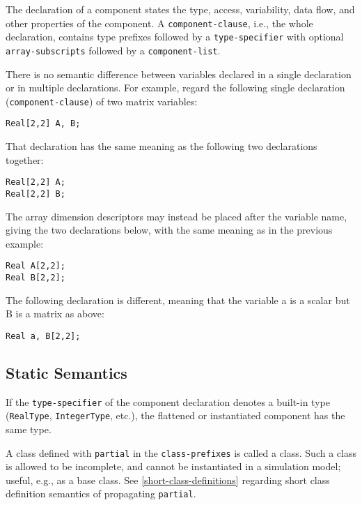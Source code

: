 \begin{nonnormative}
The declaration of a component states the type, access, variability, data flow, and other properties of the component.
A \lstinline[language=grammar]!component-clause!, i.e., the whole declaration, contains type prefixes followed by a \lstinline[language=grammar]!type-specifier! with optional \lstinline[language=grammar]!array-subscripts! followed by a \lstinline[language=grammar]!component-list!.

There is no semantic difference between variables declared in a single declaration or in multiple declarations.
For example, regard the following single declaration (\lstinline[language=grammar]!component-clause!) of two matrix variables:
\begin{lstlisting}[language=modelica]
Real[2,2] A, B;
\end{lstlisting}
That declaration has the same meaning as the following two
declarations together:
\begin{lstlisting}[language=modelica]
Real[2,2] A;
Real[2,2] B;
\end{lstlisting}
The array dimension descriptors may instead be placed after the
variable name, giving the two declarations below, with the same meaning
as in the previous example:
\begin{lstlisting}[language=modelica]
Real A[2,2];
Real B[2,2];
\end{lstlisting}
The following declaration is different, meaning that the variable
a is a scalar but B is a matrix as above:
\begin{lstlisting}[language=modelica]
Real a, B[2,2];
\end{lstlisting}
\end{nonnormative}

\subsection{Static Semantics}\label{component-declaration-static-semantics}

If the \lstinline[language=grammar]!type-specifier! of the component declaration denotes a built-in type (\lstinline!RealType!, \lstinline!IntegerType!, etc.), the flattened or instantiated component has the same type.

A class defined with \lstinline!partial! in the \lstinline[language=grammar]!class-prefixes! is called a  class.
Such a class is allowed to be incomplete, and cannot be instantiated in a simulation model; useful, e.g., as a base class.
See \cref{short-class-definitions} regarding short class definition semantics of propagating \lstinline!partial!.

